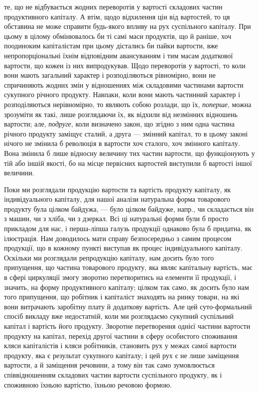 \parcont{}  %
те, що не відбувається жодних переворотів у вартості складових частин
продуктивного капіталу. А втім, щодо відхилення цін від вартостей, то
ця обставина не може справити будь-якого впливу на рух суспільного
капіталу. При цьому в цілому обмінювалось би ті самі маси продуктів,
що й раніше, хоч поодиноким капіталістам при цьому дістались би пайки
вартости, вже непропорціональні їхнім відповідним авансуванням і тим масам
додаткової вартости, що кожен із них випродукував. Щодо переворотів
у вартості, то коли вони мають загальний характер і розподіляються
рівномірно, вони не спричиняють жодних змін у відношеннях між
складовими частинами вартости сукупного річного продукту. Навпаки, коли
вони мають частинний характер і розподіляються нерівномірно, то являють
собою розлади, що їх, \emph{поперше}, можна зрозуміти як такі, лише розглядаючи
їх, як відхили від незмінних відношень вартости; але, \emph{подруге},
коли визначено закон, що згідно з ним одна частина річного продукту заміщує
сталий, а друга — змінний капітал, то в цьому законі нічого не
змінила б революція в вартости хоч сталого, хоч змінного капіталу. Вона
змінила б лише відносну величину тих частин вартости, що функціонують
у тій або іншій якості, бо на місце первісних вартостей виступили
б вартості іншої величини.

Поки ми розглядали продукцію вартости та вартість продукту капіталу,
як індивідуального капіталу, для нашої аналізи натуральна форма
товарового продукту була цілком байдужа, — було цілком байдуже, напр.,
чи складається він з машин, чи з хліба, чи з дзеркал. Всі ці натуральні
форми були б просто прикладом для нас, і перша-ліпша галузь продукції
однаково була б придатна, як ілюстрація. Нам доводилось мати
справу безпосередньо з самим процесом продукції, що в кожному пункті
виступав як процес індивідуального капіталу. Оскільки ми розглядали
репродукцію капіталу, нам досить було того припущення, що частина
товарового продукту, яка являє капітальну вартість, має в сфері циркуляції
змогу зворотно перетворитись на елементи її продукції, і значить,
на форму продуктивного капіталу; цілком так само, як досить було нам
того припущення, що робітник і капіталіст знаходять на ринку товари,
на які вони витрачають заробітну плату й додаткову вартість. Але цей
суто-формальний спосіб викладу вже недостатній, коли ми розглядаємо
сукупний суспільний капітал і вартість його продукту. Зворотне перетворення
однієї частини вартости продукту на капітал, перехід другої частини в
сферу особистого споживання кляси капіталістів і кляси робітників, становить
рух у межах самої вартости продукту, яка є результат сукупного
капіталу; і цей рух є не лише заміщення вартости, а й заміщення речовини,
а тому він так само зумовлюється співвідношенням складових
частин вартости суспільного продукту, як і споживною їхньою вартістю,
їхньою речовою формою.
\label{original-302-1}


